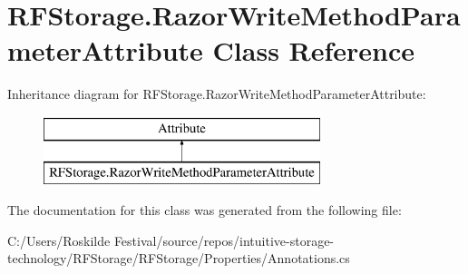 \hypertarget{class_r_f_storage_1_1_razor_write_method_parameter_attribute}{}\section{R\+F\+Storage.\+Razor\+Write\+Method\+Parameter\+Attribute Class Reference}
\label{class_r_f_storage_1_1_razor_write_method_parameter_attribute}
Inheritance diagram for R\+F\+Storage.\+Razor\+Write\+Method\+Parameter\+Attribute\+:\begin{figure}[H]
\begin{center}
\leavevmode
\includegraphics[height=2.000000cm]{class_r_f_storage_1_1_razor_write_method_parameter_attribute}
\end{center}
\end{figure}


The documentation for this class was generated from the following file\+:\begin{DoxyCompactItemize}
\item 
C\+:/\+Users/\+Roskilde Festival/source/repos/intuitive-\/storage-\/technology/\+R\+F\+Storage/\+R\+F\+Storage/\+Properties/Annotations.\+cs\end{DoxyCompactItemize}
